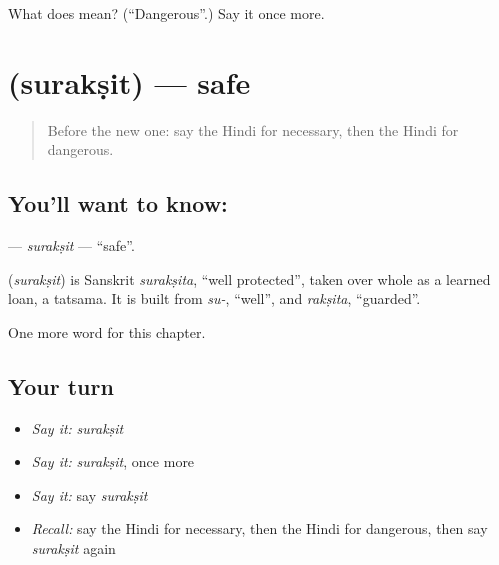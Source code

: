 \begin{tcolorbox}[breakable,colback=teal!4,colframe=teal!35!black,title={Before you move on}]
What does  mean? (\textquotedblleft{}Dangerous\textquotedblright{}.) Say it once more.
\end{tcolorbox}
\section[\texorpdfstring{\hi{सुरक्षित} (surakṣit)}{सुरक्षित (surakṣit)}]{ (surakṣit) — safe}

\label{lesson:HI-C213-suraksit}



\begin{quote}
Before the new one: say the Hindi for necessary, then the Hindi for dangerous.
\end{quote}

\subsection*{You'll want to know: }
\textbf{} — \emph{surakṣit} — \textquotedblleft{}safe\textquotedblright{}.

\begin{cousinweb}
\textbf{} (\emph{surakṣit}) is Sanskrit \emph{surakṣita}, \textquotedblleft{}well protected\textquotedblright{}, taken over whole as a learned loan, a tatsama. It is built from \emph{su-}, \textquotedblleft{}well\textquotedblright{}, and \emph{rakṣita}, \textquotedblleft{}guarded\textquotedblright{}.
\end{cousinweb}

\begin{grammarlens}[title={What you've built}]
One more word for this chapter.
\end{grammarlens}

\subsection*{Your turn}
\begin{itemize}
\raggedright
  \item \emph{Say it:} \emph{surakṣit}
  \item \emph{Say it:} \emph{surakṣit}, once more
  \item \emph{Say it:} say \emph{surakṣit}
  \item \emph{Recall:} say the Hindi for necessary, then the Hindi for dangerous, then say \emph{surakṣit} again
\end{itemize}

